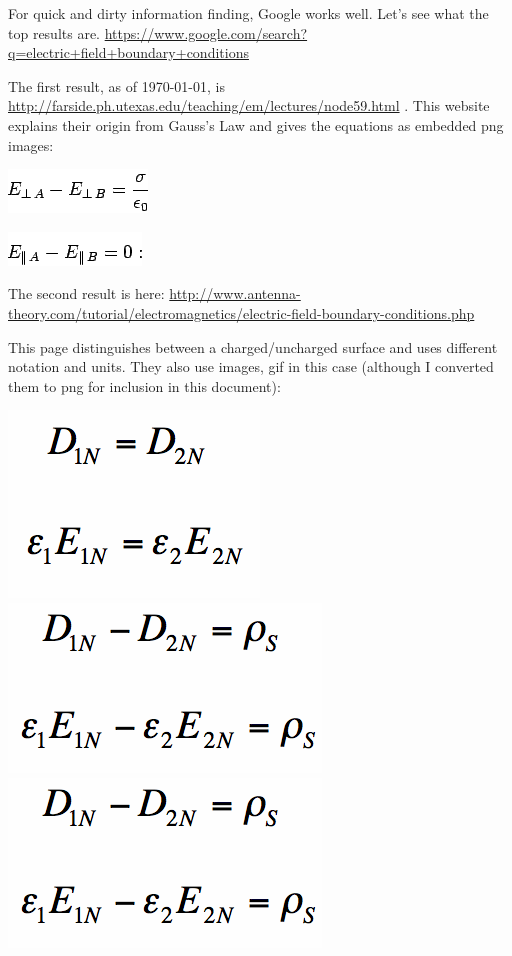 \documentclass[12pt,letterpaper]{article}
\begin{document}
For quick and dirty information finding, Google works well. Let's see what the top results are.
\url{https://www.google.com/search?q=electric+field+boundary+conditions}

The first result, as of \today, is
\url{http://farside.ph.utexas.edu/teaching/em/lectures/node59.html}
. This website explains their origin from Gauss's Law and gives the equations as embedded png images:

\begin{center}
\includegraphics[scale=0.5]{img1337.png}

\includegraphics[scale=0.5]{img1344.png}
\end{center}

The second result is here: \url{http://www.antenna-theory.com/tutorial/electromagnetics/electric-field-boundary-conditions.php}

This page distinguishes between a charged/uncharged surface and uses different notation and units. They also use images, gif in this case (although I converted them to png for inclusion in this document):
\begin{center}
\includegraphics[scale=0.3]{normalDequal.png}
\includegraphics[scale=0.3]{normalEfieldWithCharge.png}
\includegraphics[scale=0.3]{normalEfieldWithCharge.png}
\end{center}
\end{document}
